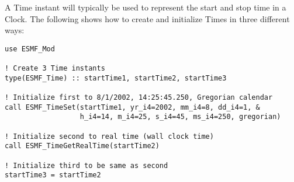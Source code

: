 
A Time instant will typically be used to represent the start and stop
time in a Clock.  The following shows how to create and initialize 
Times in three different ways:

\begin{verbatim}
use ESMF_Mod

! Create 3 Time instants
type(ESMF_Time) :: startTime1, startTime2, startTime3

! Initialize first to 8/1/2002, 14:25:45.250, Gregorian calendar
call ESMF_TimeSet(startTime1, yr_i4=2002, mm_i4=8, dd_i4=1, &
                  h_i4=14, m_i4=25, s_i4=45, ms_i4=250, gregorian)

! Initialize second to real time (wall clock time)
call ESMF_TimeGetRealTime(startTime2)

! Initialize third to be same as second
startTime3 = startTime2

\end{verbatim}
